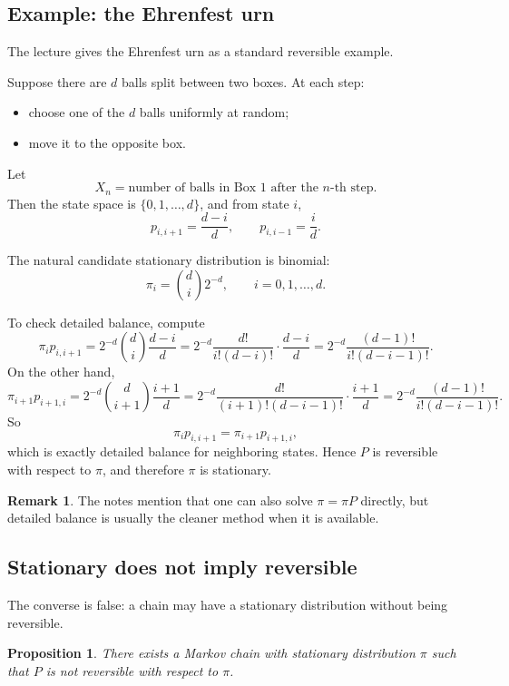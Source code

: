 \documentclass[11pt]{article}
\newtheorem{proposition}[theorem]{Proposition}
\theoremstyle{definition}
\newtheorem{remark}[theorem]{Remark}
\begin{document}
\subsection{Example: the Ehrenfest urn}

The lecture gives the Ehrenfest urn as a standard reversible example.

Suppose there are \(d\) balls split between two boxes. At each step:
\begin{itemize}[leftmargin=2em]
    \item choose one of the \(d\) balls uniformly at random;
    \item move it to the opposite box.
\end{itemize}

Let
\[
X_n=\text{number of balls in Box 1 after the \(n\)-th step}.
\]
Then the state space is \(\{0,1,\dots,d\}\), and from state \(i\),
\[
p_{i,i+1}=\frac{d-i}{d},
\qquad
p_{i,i-1}=\frac{i}{d}.
\]

The natural candidate stationary distribution is binomial:
\[
\pi_i=\binom{d}{i}2^{-d},
\qquad i=0,1,\dots,d.
\]

To check detailed balance, compute
\[
\pi_i p_{i,i+1}
=
2^{-d}\binom{d}{i}\frac{d-i}{d}
=
2^{-d}\frac{d!}{i!(d-i)!}\cdot \frac{d-i}{d}
=
2^{-d}\frac{(d-1)!}{i!(d-i-1)!}.
\]
On the other hand,
\[
\pi_{i+1}p_{i+1,i}
=
2^{-d}\binom{d}{i+1}\frac{i+1}{d}
=
2^{-d}\frac{d!}{(i+1)!(d-i-1)!}\cdot \frac{i+1}{d}
=
2^{-d}\frac{(d-1)!}{i!(d-i-1)!}.
\]
So
\[
\pi_i p_{i,i+1}=\pi_{i+1}p_{i+1,i},
\]
which is exactly detailed balance for neighboring states. Hence \(P\) is reversible with respect to \(\pi\), and therefore \(\pi\) is stationary.

\begin{remark}
The notes mention that one can also solve \(\pi=\pi P\) directly, but detailed balance is usually the cleaner method when it is available.
\end{remark}

\subsection{Stationary does not imply reversible}

The converse is false: a chain may have a stationary distribution without being reversible.

\begin{proposition}
There exists a Markov chain with stationary distribution \(\pi\) such that \(P\) is not reversible with respect to \(\pi\).
\end{proposition}
\end{document}
